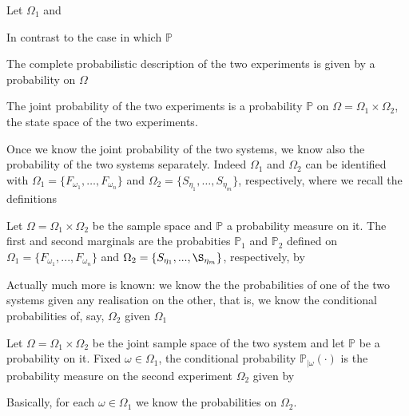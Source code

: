	\begin{example}
		Let $\Omega_1$ and		
	\end{example}
	In contrast to the case in which $\mathbb P$ 
	\begin{example}

	\end{example}
The complete probabilistic description of the two experiments is given by a probability on $\Omega$
\begin{definition}
The joint probability of the two experiments is a probability $\mathbb{P}$ on $\Omega=\Omega_1\times \Omega_2$, the state space of the two experiments.
\end{definition}
Once we know the joint probability of the two systems, we know also the probability of the two systems separately. Indeed $\Omega_1$ and $\Omega_2$ can be identified with
$\Omega_1 = \{F_{\omega_1},\ldots, F_{\omega_n}\}$ and
$\Omega_2 = \{S_{\eta_1},\ldots, S_{\eta_m}\}$, respectively, where we recall the definitions 
\begin{definition}
Let $\Omega = \Omega_1\times\Omega_2$ be the sample space and $\mathbb P$ a probability measure on it. The first and second marginals are the probabities $\mathbb P_1$ and $\mathbb P_2$ defined on $\Omega_1 = \{F_{\omega_1},...,F_{\omega_n}\}$ and $\Omega_2 = \{S_{\eta_1},...,\S_{\eta_m}\}$, respectively, by  
\end{definition}
Actually much more is known: we know the the probabilities of one of the two systems given any realisation on the other, that is, we know the conditional probabilities of, say, $\Omega_2$ given $\Omega_1$ 

\begin{definition}
Let $\Omega = \Omega_1\times \Omega_2$ be the joint sample space of the two system and let $\mathbb P$ be a probability on it. Fixed $\omega \in \Omega_1$, the conditional probability $\mathbb P_{|\omega}(\cdot)$  is the probability measure on the second experiment $\Omega_2$ given by 
\end{definition}
Basically, for each $\omega \in \Omega_1$ we know the probabilities on $\Omega_2$. 


